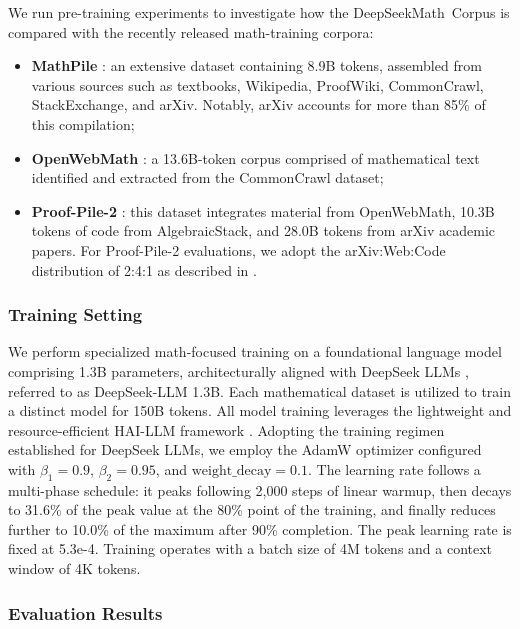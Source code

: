 \begin{itemize}[topsep=0pt]
We run pre-training experiments to investigate how the DeepSeekMath~Corpus is compared with the recently released math-training corpora:

\begin{itemize}[topsep=0pt]
    \item \textbf{MathPile} \citep{mathpile}: an extensive dataset containing 8.9B tokens, assembled from various sources such as textbooks, Wikipedia, ProofWiki, CommonCrawl, StackExchange, and arXiv. Notably, arXiv accounts for more than 85\% of this compilation;
    \item \textbf{OpenWebMath} \citep{openwebmath}: a 13.6B-token corpus comprised of mathematical text identified and extracted from the CommonCrawl dataset;
    \item \textbf{Proof-Pile-2} \citep{llemma}: this dataset integrates material from OpenWebMath, 10.3B tokens of code from AlgebraicStack, and 28.0B tokens from arXiv academic papers. For Proof-Pile-2 evaluations, we adopt the arXiv:Web:Code distribution of 2:4:1 as described in \cite{llemma}.
\end{itemize}

\subsubsection{Training Setting}
\label{sec:quality-policy}
We perform specialized math-focused training on a foundational language model comprising 1.3B parameters, architecturally aligned with DeepSeek LLMs \citep{deepseek-llm}, referred to as DeepSeek-LLM 1.3B. Each mathematical dataset is utilized to train a distinct model for 150B tokens. All model training leverages the lightweight and resource-efficient HAI-LLM framework \citep{haillm}. Adopting the training regimen established for DeepSeek LLMs, we employ the AdamW optimizer \citep{adamW} configured with $\beta_1=0.9$, $\beta_2=0.95$, and $\mathrm{weight\_decay}=0.1$. The learning rate follows a multi-phase schedule: it peaks following 2,000 steps of linear warmup, then decays to 31.6\% of the peak value at the 80\% point of the training, and finally reduces further to 10.0\% of the maximum after 90\% completion. The peak learning rate is fixed at 5.3e-4. Training operates with a batch size of 4M tokens and a context window of 4K tokens.

\subsubsection{Evaluation Results}


\end{itemize}
